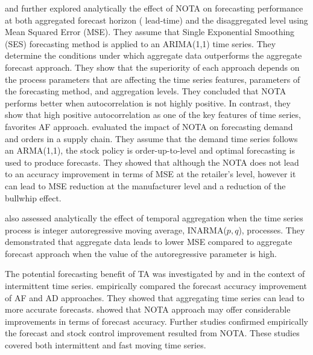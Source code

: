 \documentclass[preprint, 3p,
authoryear]{elsarticle} %
\begin{document}
\citet{rostami2013demand} and \citet{rostami2014note} further explored
analytically the effect of NOTA on forecasting performance at both
aggregated forecast horizon ( lead-time) and the disaggregated level
using Mean Squared Error (MSE). They assume that Single Exponential
Smoothing (SES) forecasting method is applied to an ARIMA(1,1) time
series. They determine the conditions under which aggregate data
outperforms the aggregate forecast approach. They show that the
superiority of each approach depends on the process parameters that are
affecting the time series features, parameters of the forecasting
method, and aggregation levels. They concluded that NOTA performs better
when autocorrelation is not highly positive. In contrast, they show that
high positive autocorrelation as one of the key features of time series,
favorites AF approach. \citet{rostami2019impact} evaluated the impact of
NOTA on forecasting demand and orders in a supply chain. They assume
that the demand time series follows an ARMA(1,1), the stock policy is
order-up-to-level and optimal forecasting is used to produce forecasts.
They showed that although the NOTA does not lead to an accuracy
improvement in terms of MSE at the retailer's level, however it can lead
to MSE reduction at the manufacturer level and a reduction of the
bullwhip effect.

\citet{mohammadipour2012forecast} also assessed analytically the effect
of temporal aggregation when the time series process is integer
autoregressive moving average, INARMA(\(p,q\)), processes. They
demonstrated that aggregate data leads to lower MSE compared to
aggregate forecast approach when the value of the autoregressive
parameter is high.

The potential forecasting benefit of TA was investigated by
\citet{willemain1994forecasting} and \citet{nikolopoulos2011aggregate}
in the context of intermittent time series.
\citet{willemain1994forecasting} empirically compared the forecast
accuracy improvement of AF and AD approaches. They showed that
aggregating time series can lead to more accurate forecasts.
\citet{nikolopoulos2011aggregate} showed that NOTA approach may offer
considerable improvements in terms of forecast accuracy. Further studies
\citep{babai2012impact, petropoulos2015forecast, kourentzes2014improving, spithourakis2011improving}
confirmed empirically the forecast and stock control improvement
resulted from NOTA. These studies covered both intermittent and fast
moving time series.
\end{document}
